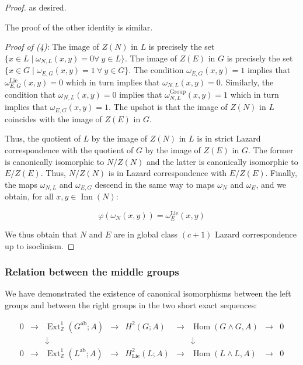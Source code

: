 \begin{proof}
  as desired.

  The proof of the other identity is similar.

  {\em Proof of (4)}: The image of $Z(N)$ in $L$ is precisely the set
  $\{x \in L \mid \omega_{N,L}(x,y) = 0 \forall \ y \in L \}$. The
  image of $Z(E)$ in $G$ is precisely the set $\{ x \in G \mid
  \omega_{E,G}(x,y) = 1 \ \forall \ y \in G \}$. The condition
  $\omega_{E,G}(x,y) = 1$ implies that $\omega_{E,G}^{\text{Lie}}(x,y)
  = 0$ which in turn implies that $\omega_{N,L}(x,y) = 0$. Similarly,
  the condition that $\omega_{N,L}(x,y) = 0$ implies that
  $\omega_{N,L}^{\text{Group}}(x,y) = 1$ which in turn implies that
  $\omega_{E,G}(x,y) = 1$. The upshot is that the image of $Z(N)$ in
  $L$ coincides with the image of $Z(E)$ in $G$.

  Thus, the quotient of $L$ by the image of $Z(N)$ in $L$ is in strict
  Lazard correspondence with the quotient of $G$ by the image of
  $Z(E)$ in $G$. The former is canonically isomorphic to $N/Z(N)$ and
  the latter is canonically isomorphic to $E/Z(E)$. Thus, $N/Z(N)$ is
  in Lazard correspondence with $E/Z(E)$. Finally, the maps
  $\omega_{N,L}$ and $\omega_{E,G}$ descend in the same way to maps
  $\omega_N$ and $\omega_E$, and we obtain, for all $x,y \in
  \operatorname{Inn}(N)$:

  $$\varphi(\omega_N(x,y)) = \omega_E^{\text{Lie}}(x,y)$$

  We thus obtain that $N$ and $E$ are in global class $(c+1)$ Lazard
  correspondence up to isoclinism.
\end{proof}

\subsubsection{Relation between the middle groups}\label{sec:glcuti-extensions-splitting}

We have demonstrated the existence of canonical isomorphisms between
the left groups and between the right groups in the two short exact
sequences:

$$\begin{array}{ccccccccc}
  0 &\to &\operatorname{Ext}^1_{\mathbb{Z}}(G^{\operatorname{ab}};A) &\to &H^2(G;A) &\to &\operatorname{Hom}(G \wedge G,A) &\to &0\\
  & & \downarrow & & & & \downarrow & & \\
  0 &\to &\operatorname{Ext}^1_{\mathbb{Z}}(L^{\operatorname{ab}};A) & \to & H^2_{\text{Lie}}(L;A) & \to & \operatorname{Hom}(L \wedge L, A) & \to & 0\\
\end{array}$$

